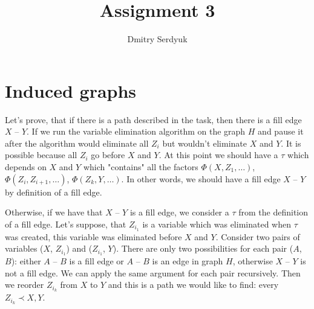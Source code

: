 \documentclass[a4paper]{article}
\author{Dmitry Serdyuk}
\title{Assignment 3}
\date{}
\begin{document}

\section{Induced graphs}

Let's prove, that if there is a path described in the task, then there is a fill edge $X$ -- $Y$.
If we run the variable elimination algorithm on the graph $H$ and pause it after the algorithm would
eliminate all $Z_i$ but wouldn't eliminate $X$ and $Y$. It is possible because all $Z_i$ go before
$X$ and $Y$. At this point we should have a $\tau$ which depends on $X$ and $Y$ which "contains" all
the factors $\Phi(X, Z_1, \ldots)$, $\Phi(Z_i, Z_{i+1}, \ldots)$, $\Phi(Z_k, Y, \ldots)$. In other
words, we should have a fill edge $X$ -- $Y$ by definition of a fill edge.


Otherwise, if we have that $X$ -- $Y$ is a fill edge, we consider a $\tau$ from the definition of
a fill edge. Let's suppose, that $Z_{i_1}$ is a variable which was eliminated when $\tau$ was created,
this variable was eliminated before $X$ and $Y$.
Consider two pairs of variables ($X$, $Z_{i_1}$) and ($Z_{i_1}$, $Y$). There are only two possibilities for
each pair ($A$, $B$): either $A$ -- $B$ is a fill edge or $A$ -- $B$ is an edge in graph $H$, otherwise
$X$ -- $Y$ is not a fill edge. We can apply the same argument for each pair recursively. Then we reorder 
$Z_{i_k}$ from $X$ to $Y$ and this is a path we would like to find: every $Z_{i_k} \prec X, Y$.
\end{document}
